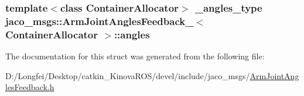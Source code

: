 \subsubsection[{\texorpdfstring{angles}{angles}}]{\setlength{\rightskip}{0pt plus 5cm}template$<$class Container\+Allocator$>$ {\bf \+\_\+angles\+\_\+type} {\bf jaco\+\_\+msgs\+::\+Arm\+Joint\+Angles\+Feedback\+\_\+}$<$ Container\+Allocator $>$\+::angles}\hypertarget{structjaco__msgs_1_1ArmJointAnglesFeedback___a5b3d327fd594aa0715666bf1c95359e4}{}\label{structjaco__msgs_1_1ArmJointAnglesFeedback___a5b3d327fd594aa0715666bf1c95359e4}


The documentation for this struct was generated from the following file\+:\begin{DoxyCompactItemize}
\item 
D\+:/\+Longfei/\+Desktop/catkin\+\_\+\+Kinova\+R\+O\+S/devel/include/jaco\+\_\+msgs/\hyperlink{ArmJointAnglesFeedback_8h}{Arm\+Joint\+Angles\+Feedback.\+h}\end{DoxyCompactItemize}
